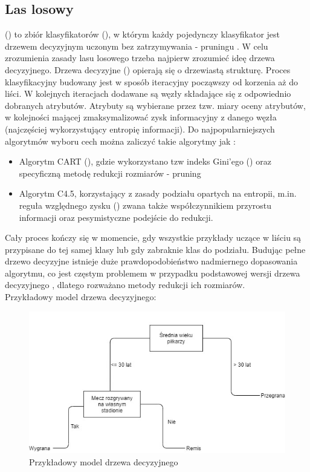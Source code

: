 \subsection{Las losowy}
\noindent
\label{algRandomForest}
 () to zbiór klasyfikatorów (), w którym każdy pojedynczy klasyfikator jest drzewem decyzyjnym uczonym bez zatrzymywania - pruningu \cite{PPlonski}. W celu zrozumienia zasady lasu losowego trzeba najpierw zrozumieć ideę drzewa decyzyjnego. Drzewa decyzyjne () opierają się o drzewiastą strukturę. Proces klasyfikacyjny budowany jest w sposób iteracyjny począwszy od korzenia aż do liści. W kolejnych iteracjach dodawane są węzły składające się z odpowiednio dobranych atrybutów. Atrybuty są wybierane przez tzw. miary oceny atrybutów, w kolejności mającej zmaksymalizować zysk informacyjny z danego węzła (najczęściej wykorzystujący entropię informacji). Do najpopularniejszych algorytmów wyboru cech można zaliczyć takie algorytmy jak \cite{DrzewoAlg}:
\begin{itemize}
    \item Algorytm CART (), gdzie wykorzystano tzw indeks Gini'ego () oraz specyficzną metodę redukcji rozmiarów - pruning
    \item Algorytm C4.5, korzystający z zasady podziału opartych na entropii, m.in. reguła względnego zysku () zwana także współczynnikiem przyrostu informacji oraz pesymistyczne podejście do redukcji.
\end{itemize}
Cały proces kończy się w momencie, gdy wszystkie przykłady uczące w liściu są przypisane do tej samej klasy lub gdy zabraknie klas do podziału. Budując pełne drzewo decyzyjne istnieje duże prawdopodobieństwo nadmiernego dopasowania algorytmu, co jest częstym problemem w przypadku podstawowej wersji drzewa decyzyjnego \cite{MGrzyb}, dlatego rozważano metody redukcji ich rozmiarów.\\

Przykładowy model drzewa decyzyjnego:
\begin{figure}[h] 
        \includegraphics[width=14cm]{figures/decTree.jpg}
        \caption{Przykładowy model drzewa decyzyjnego}
\end{figure}

